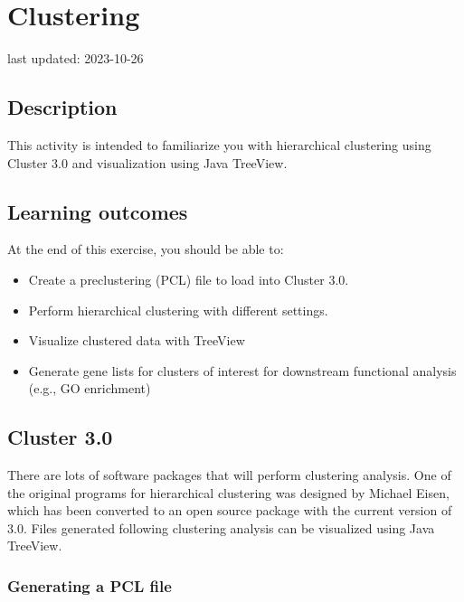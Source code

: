 \documentclass[
]{book}
\providecommand{\tightlist}{%
  \setlength{\itemsep}{0pt}\setlength{\parskip}{0pt}}
\begin{document}
\hypertarget{clustering}{%
\chapter{Clustering}\label{clustering}}

last updated: 2023-10-26

\hypertarget{description-6}{%
\section{Description}\label{description-6}}

This activity is intended to familiarize you with hierarchical clustering using Cluster 3.0 and visualization using Java TreeView.

\hypertarget{learning-outcomes-6}{%
\section{Learning outcomes}\label{learning-outcomes-6}}

At the end of this exercise, you should be able to:

\begin{itemize}
\tightlist
\item
  Create a preclustering (PCL) file to load into Cluster 3.0.
\item
  Perform hierarchical clustering with different settings.
\item
  Visualize clustered data with TreeView
\item
  Generate gene lists for clusters of interest for downstream functional analysis (e.g., GO enrichment)
\end{itemize}

\hypertarget{cluster-3.0}{%
\section{Cluster 3.0}\label{cluster-3.0}}

There are lots of software packages that will perform clustering analysis. One of the original programs for hierarchical clustering was designed by Michael Eisen, which has been converted to an open source package with the current version of 3.0. Files generated following clustering analysis can be visualized using Java TreeView.

\hypertarget{generating-a-pcl-file}{%
\subsection{Generating a PCL file}\label{generating-a-pcl-file}}
\end{document}
